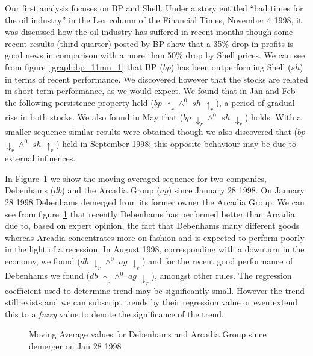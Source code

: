 Our first analysis
focuses on BP and Shell. Under a story entitled ``bad times for the
oil industry'' in the Lex column of the Financial Times, November 4
1998, it was discussed how the oil industry has suffered in recent
months though some recent results (third quarter) posted by BP show
that a 35\% drop in profits is good news in comparison with a more
than 50\% drop by Shell prices. We can see from
figure~\ref{graph:bp_11mn_1} that BP ($bp$) has been outperforming
Shell ($sh$) in
terms of recent performance. We discovered however that the stocks are
related in short term performance, as we would expect. We found that
in Jan and Feb the following persistence property held 
($bp$ $\uparrow_r \wedge^0$ $sh$ $\uparrow_r$), a period of gradual
rise in both stocks. We also found in May that  ($bp$
$\downarrow_r \wedge^0$ $sh$ $\downarrow_r$) holds. With a smaller
sequence similar results 
were obtained though we also discovered that  ($bp$ $\downarrow_r
\wedge^0$ $sh$ $\uparrow_r$) held in September 1998; this opposite behaviour
may be due to external influences.

\medskip

In Figure~\ref{graph:deb_199_2} we show the moving averaged sequence
for two companies, Debenhams ($db$) and the Arcadia Group ($ag$) since
January 28 1998. On January 28 1998 Debenhams demerged from its former
owner the
Arcadia Group. We can see from figure~\ref{graph:deb_199_2} that
recently Debenhams has performed better 
than Arcadia due to, based on expert opinion, the fact that Debenhams
many different goods whereas Arcadia concentrates more on fashion and
is expected to perform poorly in the light of a recession. In August
1998, corresponding with a downturn in the economy, we found
  ($db$ $\downarrow_r \wedge^0$ $ag$ $\downarrow_r$) and
for the recent good performance of Debenhams we found  ($db$
$\uparrow_r \wedge^0$ $ag$ $\downarrow_r$), amongst other rules. The
regression coefficient used to determine trend may be significantly
small. However the trend still exists and we can subscript trends by
their regression value or even extend this to a {\em fuzzy} value to denote the
significance of the trend. 


\begin{figure}
\centerline{}
\caption{\label{graph:deb_199_2}{Moving Average values for
Debenhams and Arcadia Group since demerger on Jan 28 1998}}
\end{figure}



